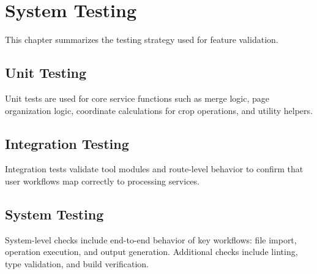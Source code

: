 \section{System Testing}
This chapter summarizes the testing strategy used for feature validation.

\subsection{Unit Testing}
Unit tests are used for core service functions such as merge logic, page organization logic, coordinate calculations for crop operations, and utility helpers.

\subsection{Integration Testing}
Integration tests validate tool modules and route-level behavior to confirm that user workflows map correctly to processing services.

\subsection{System Testing}
System-level checks include end-to-end behavior of key workflows: file import, operation execution, and output generation. Additional checks include linting, type validation, and build verification.

